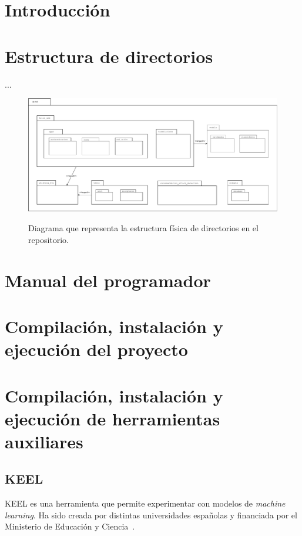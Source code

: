 
\section{Introducción}

\section{Estructura de directorios}

...

\begin{figure}[h]
	\caption[Diagrama: estructura de directorios]{Diagrama que representa la estructura física de directorios en el repositorio.}
	\centering
	\includegraphics[width=\textwidth]{../img/anexos/diagrams/repo-structure}
	\label{d:diag-repo-structure}
\end{figure}

\section{Manual del programador}

\section{Compilación, instalación y ejecución del proyecto}

\section{Compilación, instalación y ejecución de herramientas auxiliares}

\subsection{KEEL}

KEEL es una herramienta que permite experimentar con modelos de \textit{machine learning}. Ha sido creada por distintas universidades españolas y financiada por el Ministerio de Educación y Ciencia~\cite{KEEL}.

